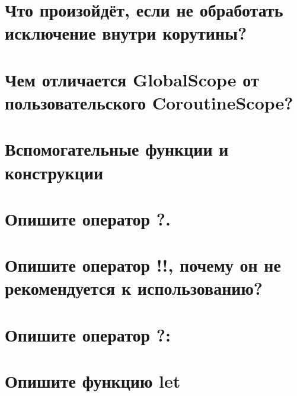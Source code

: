 \documentclass[12pt]{article}
\begin{document}
\section*{Что произойдёт, если не обработать исключение внутри корутины?}
\begin{enumerate}[leftmargin=*]
\end{enumerate}
\vspace{2mm}
\section*{Чем отличается GlobalScope от пользовательского CoroutineScope?}
\begin{enumerate}[leftmargin=*]
\end{enumerate}
\vspace{2mm}
\section*{Вспомогательные функции и конструкции}
\begin{enumerate}[leftmargin=*]
\end{enumerate}
\vspace{2mm}
\section*{Опишите оператор ?.}
\begin{enumerate}[leftmargin=*]
\end{enumerate}
\vspace{2mm}
\section*{Опишите оператор !!, почему он не рекомендуется к использованию?}
\begin{enumerate}[leftmargin=*]
\end{enumerate}
\vspace{2mm}
\section*{Опишите оператор ?:}
\begin{enumerate}[leftmargin=*]
\end{enumerate}
\vspace{2mm}
\section*{Опишите функцию let}
\begin{enumerate}[leftmargin=*]
\end{enumerate}
\vspace{2mm}
\end{document}
